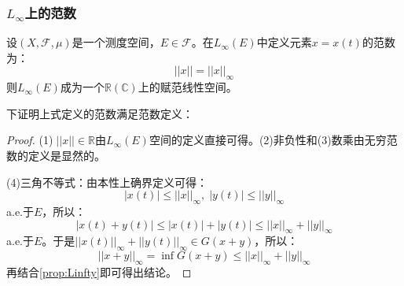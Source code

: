 \subsubsection{$L_{\infty}$上的范数}
\begin{definition}
	设$(X,\mathscr{F},\mu)$是一个测度空间，$E\in\mathscr{F}$。在$L_{\infty}(E)$中定义元素$x=x(t)$的范数为：
	\begin{equation*}
		||x||=||x||_\infty
	\end{equation*}
	则$L_{\infty}(E)$成为一个$\mathbb{R}(\mathbb{C})$上的赋范线性空间。
\end{definition}
下证明上式定义的范数满足范数定义：
\begin{proof}
	(1)$\;||x||\in\mathbb{R}$由$L_{\infty}(E)$空间的定义直接可得。(2)非负性和(3)数乘由无穷范数的定义是显然的。\par
	(4)三角不等式：由本性上确界定义可得：
	\begin{equation*}
		|x(t)|\leqslant||x||_\infty,\;|y(t)|\leqslant||y||_\infty
	\end{equation*}
	a.e.于$E$，所以：
	\begin{equation*}
		|x(t)+y(t)|\leqslant|x(t)|+|y(t)|\leqslant||x||_\infty+||y||_\infty
	\end{equation*}
	a.e.于$E$。于是$||x(t)||_\infty+||y(t)||_\infty\in G(x+y)$，所以：
	\begin{equation*}
		||x+y||_\infty=\inf G(x+y)\leqslant||x||_\infty+||y||_\infty
	\end{equation*}
	再结合\cref{prop:Linfty}即可得出结论。
\end{proof}

